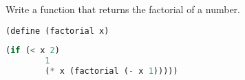\question Write a function that returns the factorial of a number.

\begin{lstlisting}[language=Scheme]
(define (factorial x)
\end{lstlisting}
\begin{solution}[1in]
\begin{lstlisting}[language=Scheme]
    (if (< x 2)
        1
        (* x (factorial (- x 1)))))
\end{lstlisting}
\end{solution}
\begin{lstlisting}[language=Scheme]
\end{lstlisting}


